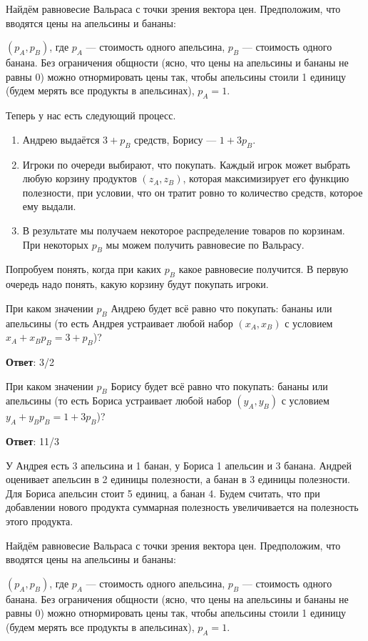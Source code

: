 Найдём равновесие Вальраса с точки зрения вектора цен. Предположим, что вводятся цены на апельсины и бананы:

$(p_A,p_B)$, где $p_A$ --- стоимость одного апельсина, $p_B$ --- стоимость одного банана. Без ограничения общности (ясно, что цены на апельсины и бананы не равны 0) можно отнормировать цены так, чтобы апельсины стоили 1 единицу (будем мерять все продукты в апельсинах), $p_A=1$.

Теперь у нас есть следующий процесс.

\begin{enumerate}
	\item Андрею выдаётся $3+p_B$ средств, Борису --- $1+3p_B$.
	\item Игроки по очереди выбирают, что покупать. Каждый игрок может выбрать любую корзину продуктов $(z_A,z_B)$, которая максимизирует его функцию полезности, при условии, что он тратит ровно то количество средств, которое ему выдали.
	\item В результате мы получаем некоторое распределение товаров по корзинам. При некоторых $p_B$ мы можем получить равновесие по Вальрасу.
\end{enumerate}
	Попробуем понять, когда при каких $p_B$ какое равновесие получится. В первую очередь надо понять, какую корзину будут покупать игроки.
	
	При каком значении $p_B$ Андрею будет всё равно что покупать: бананы или апельсины (то есть Андрея устраивает любой набор $(x_A,x_B)$ с условием $x_A + x_B p_B = 3 + p_B$)?
	
\textbf{Ответ}:
3/2	%

\task
При каком значении $p_B$ Борису будет всё равно что покупать: бананы или апельсины (то есть Бориса устраивает любой набор $(y_A,y_B)$ с условием $y_A + y_Bp_B = 1 + 3p_B$)?

\textbf{Ответ}: 
11/3

\task
У Андрея есть 3 апельсина и 1 банан, у Бориса 1 апельсин и 3 банана. Андрей оценивает апельсин в 2 единицы полезности, а банан в 3 единицы полезности. Для Бориса апельсин стоит 5 единиц, а банан 4. Будем считать, что при добавлении нового продукта суммарная полезность увеличивается на полезность этого продукта.

Найдём равновесие Вальраса с точки зрения вектора цен. Предположим, что вводятся цены на апельсины и бананы:

$(p_A,p_B)$, где $p_A$ --- стоимость одного апельсина, $p_B$ --- стоимость одного банана. Без ограничения общности (ясно, что цены на апельсины и бананы не равны 0) можно отнормировать цены так, чтобы апельсины стоили 1 единицу (будем мерять все продукты в апельсинах), $p_A=1$.


